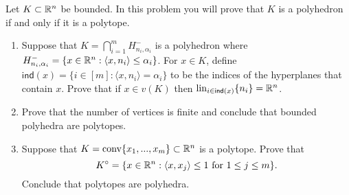\documentclass[12pt]{article}
\begin{document}
\begin{problem}
	Let $K \subset \mathbb{R}^n$ be bounded. In this problem you will prove that $K$ is a polyhedron if and only if it is a polytope. 
    \begin{enumerate}[label = (\alph*)]
        \item Suppose that $K = \bigcap_{i = 1}^m H_{n_i, \alpha_i}^-$ is a polyhedron where $H_{n_i, \alpha_i}^- = \{x \in \mathbb{R}^n : \langle x, n_i \rangle \leq \alpha_i\}$. For $x \in K$, define $\mathsf{ind}(x) = \{i \in [m] : \langle x, n_i \rangle = \alpha_i\}$ to be the indices of the hyperplanes that contain $x$. Prove that if $x \in v(K)$ then $\operatorname{lin}_{i \in \mathsf{ind}(x)} \{n_i\} = \mathbb{R}^n$. 
        
        \item Prove that the number of vertices is finite and conclude that bounded polyhedra are polytopes. 
        
        \item Suppose that $K = \operatorname{conv} \{x_1, ..., x_m\} \subset \mathbb{R}^n$ is a polytope. Prove that
        \[
            K^\circ = \{x \in \mathbb{R}^n : \langle x, x_j \rangle \leq 1 \text{ for } 1 \leq j \leq m\}.
        \]
        Conclude that polytopes are polyhedra.
    \end{enumerate}
\end{problem}
\end{document}
